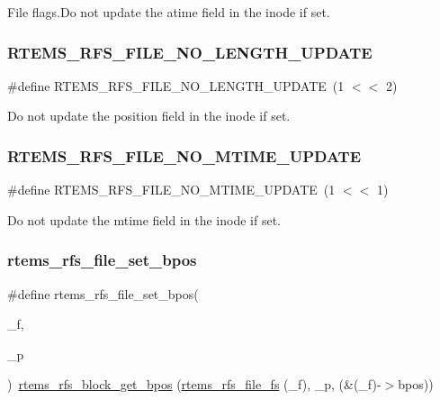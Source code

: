 File flags.\+Do not update the atime field in the inode if set. \mbox{\label{rtems-rfs-file_8h_a9e9bbd4e5f667652ead3ad1268bfe049}} 
\subsubsection{\texorpdfstring{RTEMS\_RFS\_FILE\_NO\_LENGTH\_UPDATE}{RTEMS\_RFS\_FILE\_NO\_LENGTH\_UPDATE}}
{\footnotesize\ttfamily \#define R\+T\+E\+M\+S\+\_\+\+R\+F\+S\+\_\+\+F\+I\+L\+E\+\_\+\+N\+O\+\_\+\+L\+E\+N\+G\+T\+H\+\_\+\+U\+P\+D\+A\+TE~(1 $<$$<$ 2)}

Do not update the position field in the inode if set. \mbox{\label{rtems-rfs-file_8h_a3f537f7b4684a012ca3e27bf608b9ac3}} 
\subsubsection{\texorpdfstring{RTEMS\_RFS\_FILE\_NO\_MTIME\_UPDATE}{RTEMS\_RFS\_FILE\_NO\_MTIME\_UPDATE}}
{\footnotesize\ttfamily \#define R\+T\+E\+M\+S\+\_\+\+R\+F\+S\+\_\+\+F\+I\+L\+E\+\_\+\+N\+O\+\_\+\+M\+T\+I\+M\+E\+\_\+\+U\+P\+D\+A\+TE~(1 $<$$<$ 1)}

Do not update the mtime field in the inode if set. \mbox{\label{rtems-rfs-file_8h_a644b7fe2a81feb968c67d75744ca16a7}} 
\subsubsection{\texorpdfstring{rtems\_rfs\_file\_set\_bpos}{rtems\_rfs\_file\_set\_bpos}}
{\footnotesize\ttfamily \#define rtems\+\_\+rfs\+\_\+file\+\_\+set\+\_\+bpos(\begin{DoxyParamCaption}\item[{}]{\+\_\+f,  }\item[{}]{\+\_\+p }\end{DoxyParamCaption})~\mbox{\hyperlink{rtems-rfs-block_8c_a35848429d41d99f4aab4be97b41a324e}{rtems\+\_\+rfs\+\_\+block\+\_\+get\+\_\+bpos}} (\mbox{\hyperlink{rtems-rfs-file_8h_a4c7546d9fdb507dcd132e994a235242a}{rtems\+\_\+rfs\+\_\+file\+\_\+fs}} (\+\_\+f), \+\_\+p, (\&(\+\_\+f)-\/$>$bpos))}

